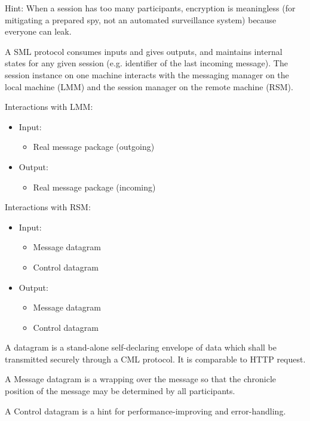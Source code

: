 \documentclass[a4paper,11pt]{article}
\begin{document}
Hint: When a session has too many participants, encryption is meaningless
(for mitigating a prepared spy, not an automated surveillance system) because everyone can leak.

A SML protocol consumes inputs and gives outputs,
and maintains internal states for any given session (e.g. identifier of the last incoming message).
The session instance on one machine interacts with the messaging manager on the local machine (LMM)
and the session manager on the remote machine (RSM).

Interactions with LMM:

\begin{itemize}
	\item Input:
	      \begin{itemize}
		      \item Real message package (outgoing)
	      \end{itemize}
	\item Output:
	      \begin{itemize}
		      \item Real message package (incoming)
	      \end{itemize}
\end{itemize}

Interactions with RSM:

\begin{itemize}
	\item Input:
	      \begin{itemize}
		      \item Message datagram
		      \item Control datagram
	      \end{itemize}
	\item Output:
	      \begin{itemize}
		      \item Message datagram
		      \item Control datagram
	      \end{itemize}
\end{itemize}

A datagram is a stand-alone self-declaring envelope of data which shall be transmitted securely through a CML protocol.
It is comparable to HTTP request.

A Message datagram is a wrapping over the message so that the chronicle position of the message may be determined by all participants.

A Control datagram is a hint for performance-improving and error-handling.
\end{document}
